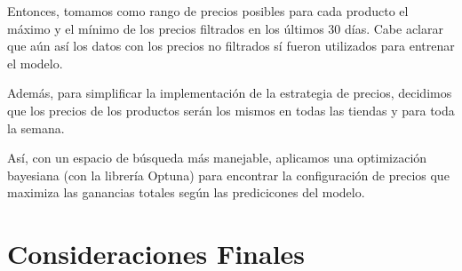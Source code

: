 \documentclass[12pt,a4paper]{article}
\begin{document}
Entonces, tomamos como rango de precios posibles para cada producto el máximo y el mínimo de los precios filtrados en los últimos 30 días. Cabe aclarar que 
aún así los datos con los precios no filtrados sí fueron utilizados para entrenar el modelo.

\vspace{0.2cm}

Además, para simplificar la implementación de la estrategia de precios, decidimos que los precios de los productos serán los mismos en todas las tiendas y 
para toda la semana.

\vspace{0.2cm}

Así, con un espacio de búsqueda más manejable, aplicamos una optimización bayesiana (con la librería Optuna) para encontrar la configuración de precios 
que maximiza las ganancias totales según las predicicones del modelo.



\newpage

\section{Consideraciones Finales}
\end{document}
